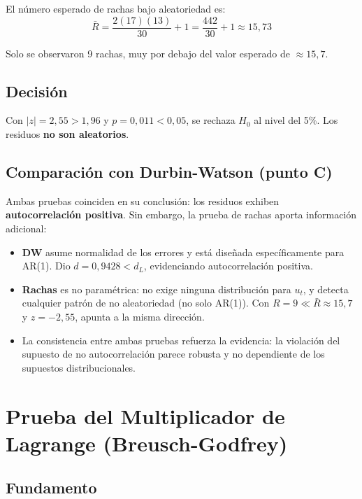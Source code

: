 \documentclass[12pt,a4paper]{article}
\begin{document}
El número esperado de rachas bajo aleatoriedad es:
\[
  \bar{R} = \frac{2(17)(13)}{30}+1 = \frac{442}{30}+1 \approx 15{,}73
\]

Solo se observaron 9 rachas, muy por debajo del valor esperado de
$\approx 15{,}7$.

\subsection{Decisión}

Con $|z|=2{,}55 > 1{,}96$ y $p=0{,}011<0{,}05$, se rechaza $H_0$ al nivel
del 5\%. Los residuos \textbf{no son aleatorios}.

\subsection{Comparación con Durbin-Watson (punto C)}

Ambas pruebas coinciden en su conclusión: los residuos exhiben
\textbf{autocorrelación positiva}. Sin embargo, la prueba de rachas aporta
información adicional:

\begin{itemize}
  \item \textbf{DW} asume normalidad de los errores y está diseñada
        específicamente para AR(1). Dio $d=0{,}9428<d_L$, evidenciando
        autocorrelación positiva.

  \item \textbf{Rachas} es no paramétrica: no exige ninguna distribución
        para $u_t$, y detecta cualquier patrón de no aleatoriedad
        (no solo AR(1)). Con $R=9 \ll \bar{R}\approx 15{,}7$ y $z=-2{,}55$,
        apunta a la misma dirección.

  \item La consistencia entre ambas pruebas refuerza la evidencia: la
        violación del supuesto de no autocorrelación parece robusta y
        no dependiente de los supuestos distribucionales.
\end{itemize}

\section{Prueba del Multiplicador de Lagrange (Breusch-Godfrey)}
\label{sec:E}

\subsection{Fundamento}
\end{document}
